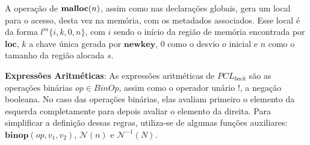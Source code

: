     






A operação de $\mathbf{malloc}(n)$, assim como nas declarações globais, gera um local para o acesso, desta vez na memória, com os metadados associados. Esse local é da forma $l^m\{i, k, 0, n\}$, com $i$ sendo o início da região de memória encontrada por $\mathbf{loc}$, $k$ a chave única gerada por $\mathbf{newkey}$, 0 como o desvio $o$ inicial e $n$ como o tamanho da região alocada $s$.

\textbf{Expressões Aritméticas}: As expressões aritméticas de $PCL_{back}$ são as operações binárias $op \in BinOp$, assim como o operador unário $!$, a negação booleana. No caso das operações binárias, elas avaliam primeiro o elemento da esquerda completamente para depois avaliar o elemento da direita. Para simplificar a definição dessas regras, utiliza-se de algumas funções auxiliares: $\mathbf{binop}(op, v_1, v_2)$, $\mathcal{N}(n)$ e $\mathcal{N}^{-1}(N)$. 

